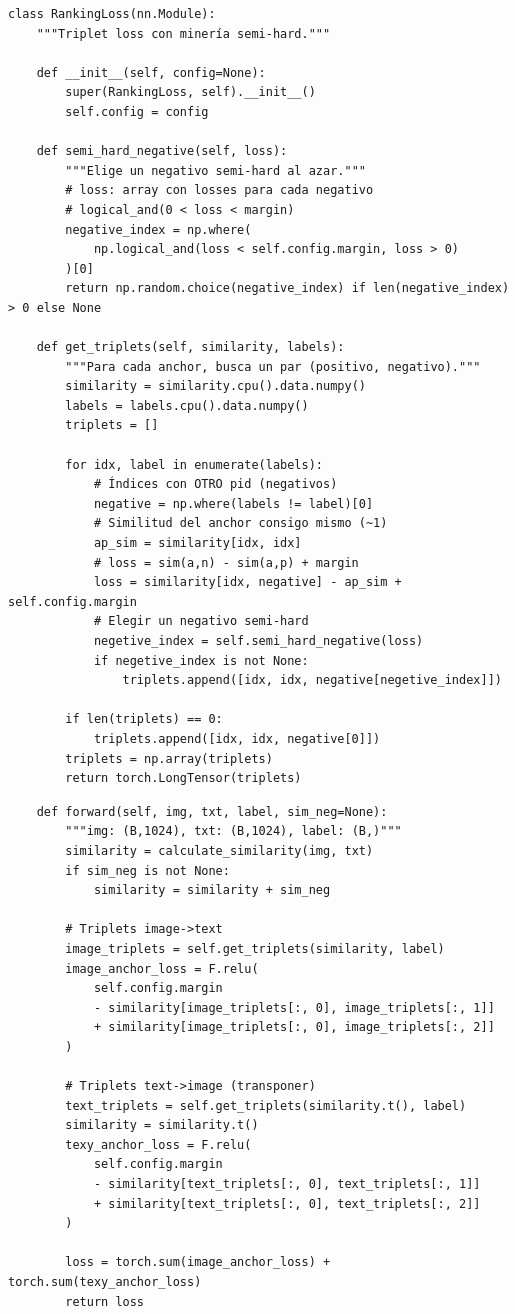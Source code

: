 \begin{verbatim}
class RankingLoss(nn.Module):
    """Triplet loss con minería semi-hard."""

    def __init__(self, config=None):
        super(RankingLoss, self).__init__()
        self.config = config

    def semi_hard_negative(self, loss):
        """Elige un negativo semi-hard al azar."""
        # loss: array con losses para cada negativo
        # logical_and(0 < loss < margin)
        negative_index = np.where(
            np.logical_and(loss < self.config.margin, loss > 0)
        )[0]
        return np.random.choice(negative_index) if len(negative_index) > 0 else None

    def get_triplets(self, similarity, labels):
        """Para cada anchor, busca un par (positivo, negativo)."""
        similarity = similarity.cpu().data.numpy()
        labels = labels.cpu().data.numpy()
        triplets = []

        for idx, label in enumerate(labels):
            # Índices con OTRO pid (negativos)
            negative = np.where(labels != label)[0]
            # Similitud del anchor consigo mismo (~1)
            ap_sim = similarity[idx, idx]
            # loss = sim(a,n) - sim(a,p) + margin
            loss = similarity[idx, negative] - ap_sim + self.config.margin
            # Elegir un negativo semi-hard
            negetive_index = self.semi_hard_negative(loss)
            if negetive_index is not None:
                triplets.append([idx, idx, negative[negetive_index]])

        if len(triplets) == 0:
            triplets.append([idx, idx, negative[0]])
        triplets = np.array(triplets)
        return torch.LongTensor(triplets)
\end{verbatim}

\begin{verbatim}
    def forward(self, img, txt, label, sim_neg=None):
        """img: (B,1024), txt: (B,1024), label: (B,)"""
        similarity = calculate_similarity(img, txt)
        if sim_neg is not None:
            similarity = similarity + sim_neg

        # Triplets image->text
        image_triplets = self.get_triplets(similarity, label)
        image_anchor_loss = F.relu(
            self.config.margin
            - similarity[image_triplets[:, 0], image_triplets[:, 1]]
            + similarity[image_triplets[:, 0], image_triplets[:, 2]]
        )

        # Triplets text->image (transponer)
        text_triplets = self.get_triplets(similarity.t(), label)
        similarity = similarity.t()
        texy_anchor_loss = F.relu(
            self.config.margin
            - similarity[text_triplets[:, 0], text_triplets[:, 1]]
            + similarity[text_triplets[:, 0], text_triplets[:, 2]]
        )

        loss = torch.sum(image_anchor_loss) + torch.sum(texy_anchor_loss)
        return loss
\end{verbatim}

